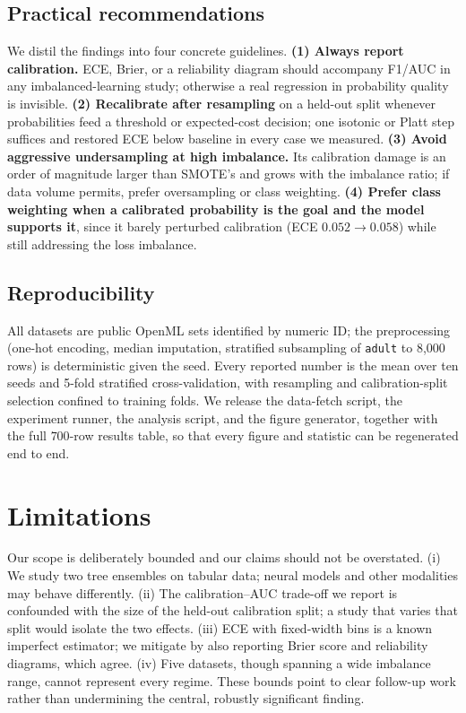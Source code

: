 \documentclass[conference]{IEEEtran}
\begin{document}
\subsection{Practical recommendations}
We distil the findings into four concrete guidelines.
\textbf{(1) Always report calibration.} ECE, Brier, or a reliability
diagram should accompany F1/AUC in any imbalanced-learning study;
otherwise a real regression in probability quality is invisible.
\textbf{(2) Recalibrate after resampling} on a held-out split whenever
probabilities feed a threshold or expected-cost decision; one isotonic or
Platt step suffices and restored ECE below baseline in every case we
measured. \textbf{(3) Avoid aggressive undersampling at high imbalance.}
Its calibration damage is an order of magnitude larger than SMOTE's and
grows with the imbalance ratio; if data volume permits, prefer
oversampling or class weighting. \textbf{(4) Prefer class weighting when a
calibrated probability is the goal and the model supports it}, since it
barely perturbed calibration (ECE $0.052\to0.058$) while still addressing
the loss imbalance.

\subsection{Reproducibility}
All datasets are public OpenML sets identified by numeric ID; the
preprocessing (one-hot encoding, median imputation, stratified
subsampling of \texttt{adult} to 8{,}000 rows) is deterministic given the
seed. Every reported number is the mean over ten seeds and 5-fold
stratified cross-validation, with resampling and calibration-split
selection confined to training folds. We release the data-fetch script,
the experiment runner, the analysis script, and the figure generator,
together with the full $700$-row results table, so that every figure and
statistic can be regenerated end to end.

\section{Limitations}
Our scope is deliberately bounded and our claims should not be
overstated. (i) We study two tree ensembles on tabular data; neural
models and other modalities may behave differently. (ii) The
calibration--AUC trade-off we report is confounded with the size of the
held-out calibration split; a study that varies that split would isolate
the two effects. (iii) ECE with fixed-width bins is a known imperfect
estimator; we mitigate by also reporting Brier score and reliability
diagrams, which agree. (iv) Five datasets, though spanning a wide
imbalance range, cannot represent every regime. These bounds point to
clear follow-up work rather than undermining the central, robustly
significant finding.
\end{document}
